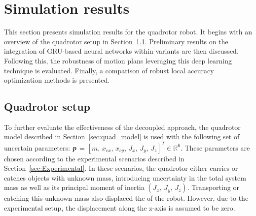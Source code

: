 \section{Simulation results} \label{sec:SimuResults}

This section presents simulation results for the quadrotor robot. 
It begins with an overview of the quadrotor setup in Section~\ref{sec:quad_setup}. 
Preliminary results on the integration of GRU-based neural networks within  variants are then discussed. 
Following this, the robustness of motion plans leveraging this deep learning technique is evaluated. 
Finally, a comparison of robust local accuracy optimization methods is presented.

\subsection{Quadrotor setup} \label{sec:quad_setup}

To further evaluate the effectiveness of the decoupled approach, the quadrotor model described in Section~\ref{sec:quad_model} is used with the following set of uncertain parameters: $\boldsymbol{p}$ = $[m, \, x_{cx}, \, x_{cy}, \, J_{x}, \, J_{y}, \,J_{z}]^T \in \mathbb{R}^{6}$.
These parameters are chosen according to the experimental scenarios described in Section~\ref{sec:Experimental}.
In these scenarios, the quadrotor either carries or catches objects with unknown mass, introducing uncertainty in the total system mass as well as its principal moment of inertia $(J_{x}, \, J_{y}, \,J_{z})$.
Transporting or catching this unknown mass also displaced the  of the robot.
However, due to the experimental setup, the displacement along the z-axis is assumed to be zero.

